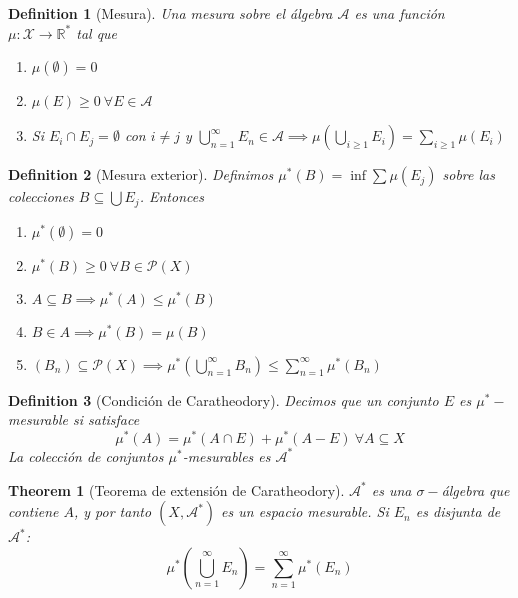 \documentclass[leqno]{article}
\newtheorem*{definition}{Definition}
\newtheorem*{theorem}{Theorem}
\begin{document}
\begin{definition}[Mesura] Una mesura sobre el álgebra $\mathcal{A}$ es una función $\mu : \mathcal{X}\to \mathbb{R}^*$ tal que
  \begin{enumerate}[topsep=-6pt, itemsep=0pt]
    \item $\mu(\emptyset) = 0$
	\item  $\mu(E)\ge 0 \ \forall E \in \mathcal{A}$ 
	\item Si $E_i \cap E_j = \emptyset$ con $i\neq j$ y $\bigcup_{n=1}^\infty E_n\in \mathcal{A} \implies \displaystyle \mu\left( \bigcup_{i\ge 1} E_i \right) = \sum_{i\ge 1}\mu(E_{i})  $
  \end{enumerate}
\end{definition}

\begin{definition}[Mesura exterior]
Definimos $\displaystyle \mu^*(B) = \inf \sum\mu(E_j)$ sobre las colecciones $B\subseteq \bigcup E_j$. Entonces 
\begin{enumerate}[topsep=-6pt, itemsep=0pt]
  \item $\mu^*(\emptyset) = 0$
  \item $\mu^*(B)\ge 0 \ \forall B\in \mathcal{P}(X)$
  \item $A\subseteq B \implies \mu^*(A) \le \mu^* (B)$
  \item $B\in A \implies \mu^*(B) = \mu(B)$
  \item $(B_n)\subseteq \mathcal{P}(X) \implies \displaystyle \mu^* \left( \bigcup_{n=1}^\infty B_n \right) \le \sum_{n=1}^\infty \mu^*(B_n) $
\end{enumerate}
\end{definition}

\begin{definition}[Condición de Caratheodory] Decimos que un conjunto $E$ es $\mu^*-$mesurable si satisface
\[
\mu^*(A) = \mu^*(A \cap E) + \mu^*(A-E) \ \forall A\subseteq X
\] 
La colección de conjuntos $\mu^*$-mesurables es $\mathcal{A}^*$
\end{definition}

\begin{theorem}[Teorema de extensión de Caratheodory]
$\mathcal{A}^*$ es una $\sigma-$álgebra que contiene $A$, y por tanto  $(X, \mathcal{A}^*)$ es un espacio mesurable. Si $E_n$ es disjunta de  $\mathcal{A}^*$:
\[
\mu^*\left( \bigcup_{n=1}^\infty E_n \right) = \sum_{n=1}^\infty \mu^*(E_n)
\] 

\end{theorem}
\end{document}
